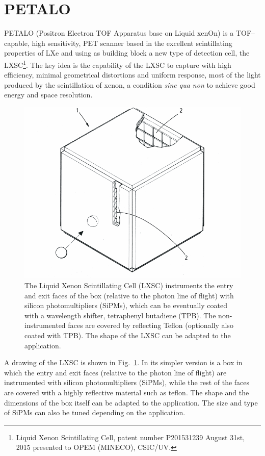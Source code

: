 \documentclass[review]{elsarticle}
\begin{document}
\section{PETALO}\label{sec.petalo}

PETALO (Positron Electron TOF Apparatus base on Liquid xenOn) is a TOF--capable, high sensitivity, PET scanner based in the excellent scintillating properties of LXe and using as building block a new type of detection cell,  the LXSC\footnote{Liquid Xenon Scintillating Cell, patent number P201531239 August 31st, 2015 presented to OPEM (MINECO), CSIC/UV.}. The key idea is the capability of the LXSC to capture with high efficiency, minimal geometrical distortions and uniform response, most of the light produced by the scintillation of xenon, a condition \emph{sine qua non} to achieve good energy and space resolution. 

\begin{figure}[!htbp]
	\centering
	\includegraphics[scale=0.6]{../img/LXSC2.pdf}
	\caption{\label{fig.box} The Liquid Xenon Scintillating Cell (LXSC) instruments the entry and exit faces of the box (relative to the photon line of flight) with silicon photomultipliers (SiPMs), which can be eventually coated with a wavelength shifter, tetraphenyl butadiene (TPB). The non-instrumented faces are covered by reflecting Teflon (optionally also coated with TPB). The shape of the LXSC can be adapted to the application. }
\end{figure}

A drawing of the LXSC is shown in Fig.~\ref{fig.box}. In its simpler version is a box in which 
the entry and exit faces (relative to the photon line of flight) are instrumented with silicon photomultipliers (SiPMs), while the rest of the faces are covered with a highly reflective material such as teflon. The shape and the dimensions of the box itself can be adapted to the application. The size and type of SiPMs can also be tuned depending on the application.
\end{document}
